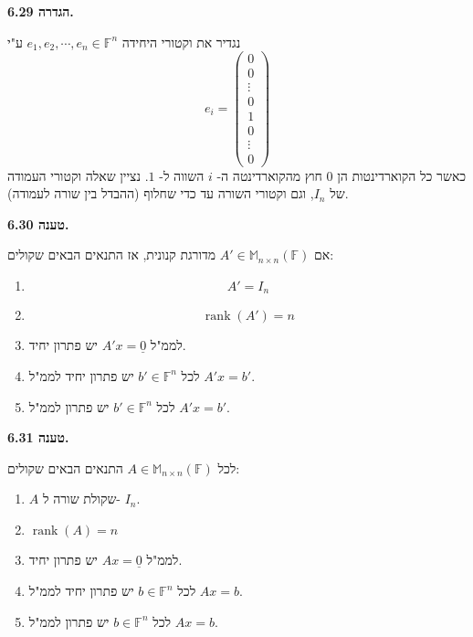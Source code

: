 \documentclass[12pt]{report}
\theoremstyle{plain}
\theoremstyle{definition}
\newcommand{\F}{\mathbb{F}}
\DeclareMathOperator{\rank}{rank}
\newcommand{\M}{\mathbb{M}}
\newcommand{\0}{\mathbf{0}}
\begin{document}
\noindent\textbf{הגדרה 6.29.}

נגדיר את וקטורי היחידה
$e_1,e_2,\cdots,e_n\in\F^n$
ע"י
$$
e_i=\begin{pmatrix}
0 \\
0 \\
\vdots \\
0 \\
1 \\
0\\
\vdots \\
0
\end{pmatrix}
$$
כאשר כל הקוארדינטות הן
$0$
חוץ מהקוארדינטה ה-
$i$
השווה ל-
$1$.
נציין שאלה וקטורי העמודה של 
$I_n$,
וגם וקטורי השורה עד כדי שחלוף (ההבדל בין שורה לעמודה).
\bigskip
\bigskip

\noindent\textbf{טענה 6.30.}

אם
$A'\in\M_{n\times n}(\F)$
מדורגת קנונית, אז התנאים הבאים שקולים:

\begin{enumerate}[label=(\alph*)]
\item 
$$A'=I_n$$


\item 
$$\rank(A')=n$$


\item 
לממ"ל
$A'x=\underline{0}$
יש פתרון יחיד.


\item 
לכל
$b'\in\F^n$
יש פתרון יחיד לממ"ל
$A'x=b'$.


\item 
לכל
$b'\in\F^n$
יש פתרון לממ"ל
$A'x=b'$.


\end{enumerate}
\bigskip
\bigskip

\noindent\textbf{טענה 6.31.}

לכל
$A\in\M_{n\times n}(\F)$
התנאים הבאים שקולים:
\begin{enumerate}[label=(\alph*)]
\item 
$A$
שקולת שורה ל-
$I_n$.


\item 
$\rank(A)=n$


\item 
לממ"ל
$Ax=\underline{0}$
יש פתרון יחיד.


\item 
לכל
$b\in\F^n$
יש פתרון יחיד לממ"ל
$Ax=b$.


\item 
לכל
$b\in\F^n$
יש פתרון לממ"ל
$Ax=b$.


\end{enumerate}
\bigskip
\bigskip
\end{document}
